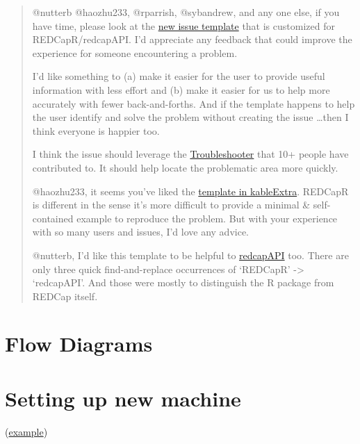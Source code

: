 \documentclass[
]{book}
\begin{document}
\begin{quote}
@nutterb @haozhu233, @rparrish, @sybandrew, and any one else, if you have time, please look at the \href{https://github.com/OuhscBbmc/REDCapR/blob/master/.github/ISSUE_TEMPLATE/unexpected-behavior-issue-template.md}{new issue template} that is customized for REDCapR/redcapAPI. I'd appreciate any feedback that could improve the experience for someone encountering a problem.

I'd like something to (a) make it easier for the user to provide useful information with less effort and (b) make it easier for us to help more accurately with fewer back-and-forths. And if the template happens to help the user identify and solve the problem without creating the issue \ldots then I think everyone is happier too.

I think the issue should leverage the \href{https://ouhscbbmc.github.io/REDCapR/articles/TroubleshootingApiCalls.html}{Troubleshooter} that 10+ people have contributed to. It should help locate the problematic area more quickly.

@haozhu233, it seems you've liked the \href{https://github.com/haozhu233/kableExtra/issues/new?template=bug_report.md}{template in kableExtra}. REDCapR is different in the sense it's more difficult to provide a minimal \& self-contained example to reproduce the problem. But with your experience with so many users and issues, I'd love any advice.

@nutterb, I'd like this template to be helpful to \href{https://github.com/nutterb/redcapAPI}{redcapAPI} too. There are only three quick find-and-replace occurrences of `REDCapR' -\textgreater{} `redcapAPI'. And those were mostly to distinguish the R package from REDCap itself.
\end{quote}

\hypertarget{flow-diagrams}{%
\section{Flow Diagrams}\label{flow-diagrams}}

\hypertarget{setting-up-new-machine}{%
\section{Setting up new machine}\label{setting-up-new-machine}}

(\href{https://github.com/OuhscBbmc/RedcapExamplesAndPatterns/blob/master/DocumentationGlobal/ResourcesInstallation.md}{example})
\end{document}

